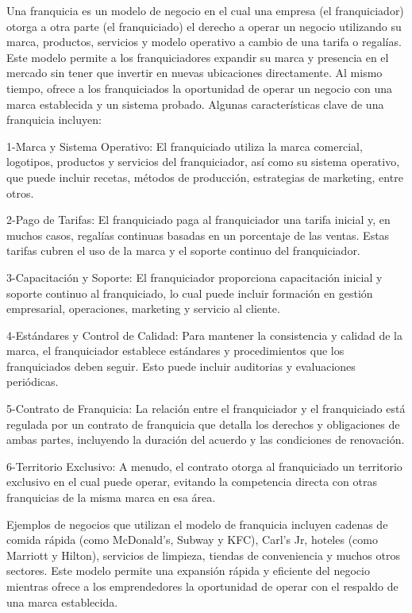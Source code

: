 \documentclass[
  us-letterpaper,
]{scrreprt}
\theoremstyle{plain}
\theoremstyle{plain}
\theoremstyle{definition}
\theoremstyle{remark}
\begin{document}
Una franquicia es un modelo de negocio en el cual una empresa (el
franquiciador) otorga a otra parte (el franquiciado) el derecho a operar
un negocio utilizando su marca, productos, servicios y modelo operativo
a cambio de una tarifa o regalías. Este modelo permite a los
franquiciadores expandir su marca y presencia en el mercado sin tener
que invertir en nuevas ubicaciones directamente. Al mismo tiempo, ofrece
a los franquiciados la oportunidad de operar un negocio con una marca
establecida y un sistema probado. Algunas características clave de una
franquicia incluyen:

1-Marca y Sistema Operativo: El franquiciado utiliza la marca comercial,
logotipos, productos y servicios del franquiciador, así como su sistema
operativo, que puede incluir recetas, métodos de producción, estrategias
de marketing, entre otros.

2-Pago de Tarifas: El franquiciado paga al franquiciador una tarifa
inicial y, en muchos casos, regalías continuas basadas en un porcentaje
de las ventas. Estas tarifas cubren el uso de la marca y el soporte
continuo del franquiciador.

3-Capacitación y Soporte: El franquiciador proporciona capacitación
inicial y soporte continuo al franquiciado, lo cual puede incluir
formación en gestión empresarial, operaciones, marketing y servicio al
cliente.

4-Estándares y Control de Calidad: Para mantener la consistencia y
calidad de la marca, el franquiciador establece estándares y
procedimientos que los franquiciados deben seguir. Esto puede incluir
auditorias y evaluaciones periódicas.

5-Contrato de Franquicia: La relación entre el franquiciador y el
franquiciado está regulada por un contrato de franquicia que detalla los
derechos y obligaciones de ambas partes, incluyendo la duración del
acuerdo y las condiciones de renovación.

6-Territorio Exclusivo: A menudo, el contrato otorga al franquiciado un
territorio exclusivo en el cual puede operar, evitando la competencia
directa con otras franquicias de la misma marca en esa área.

Ejemplos de negocios que utilizan el modelo de franquicia incluyen
cadenas de comida rápida (como McDonald's, Subway y KFC), Carl's Jr,
hoteles (como Marriott y Hilton), servicios de limpieza, tiendas de
conveniencia y muchos otros sectores. Este modelo permite una expansión
rápida y eficiente del negocio mientras ofrece a los emprendedores la
oportunidad de operar con el respaldo de una marca establecida.
\end{document}
